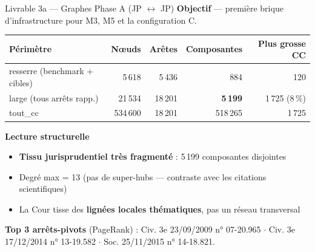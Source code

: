 \documentclass[aspectratio=169,10pt]{beamer}
\begin{document}
\begin{frame}{Livrable 3a --- Graphes Phase A (JP $\leftrightarrow$ JP)}
  \textbf{Objectif} --- première brique d'infrastructure pour M3, M5 et la configuration C.

  \footnotesize
  \begin{tabular}{@{}l r r r r@{}}
    \toprule
    \textbf{Périmètre} & \textbf{N\oe uds} & \textbf{Arêtes} & \textbf{Composantes} & \textbf{Plus grosse CC} \\
    \midrule
    resserre (benchmark + cibles) & 5\,618   & 5\,436  & 884        & 120 \\
    large    (tous arrêts rapp.)  & 21\,534  & 18\,201 & \textbf{5\,199} & 1\,725 (8\,\%) \\
    tout\_cc                      & 534\,600 & 18\,201 & 518\,265   & 1\,725 \\
    \bottomrule
  \end{tabular}

  \vspace{0.5em}
  \textbf{Lecture structurelle}
  \begin{itemize}\footnotesize
    \item \textcolor{warn}{\textbf{Tissu jurisprudentiel très fragmenté}} : 5\,199 composantes disjointes
    \item Degré max = 13 (pas de super-hubs --- contraste avec les citations scientifiques)
    \item La Cour tisse des \textbf{lignées locales thématiques}, pas un réseau transversal
  \end{itemize}

  \vspace{0.3em}
  \textbf{Top 3 arrêts-pivots} (PageRank) : Civ. 3e 23/09/2009 n° 07-20.965 $\cdot$ Civ. 3e 17/12/2014 n° 13-19.582 $\cdot$ Soc. 25/11/2015 n° 14-18.821.
\end{frame}
\end{document}

